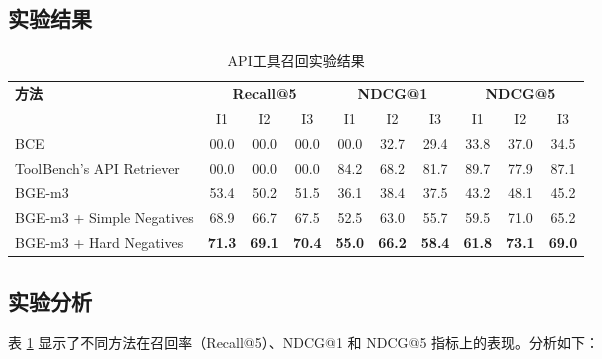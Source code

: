 \subsection{实验结果}

\begin{table}[!ht]
  \centering
  \caption{API工具召回实验结果}
  \label{tab:comparison}
  \begin{tabular}{l|ccc|ccc|ccc}
    \toprule
    \textbf{方法} & \multicolumn{3}{c|}{\textbf{Recall@5}} & \multicolumn{3}{c|}{\textbf{NDCG@1}} & \multicolumn{3}{c}{\textbf{NDCG@5}} \\
    & I1 & I2 & I3 & I1 & I2 & I3 & I1 & I2 & I3 \\
    \midrule

    BCE            & 00.0 & 00.0 & 00.0 & 00.0 & 32.7 & 29.4 & 33.8 & 37.0 & 34.5 \\
    ToolBench's API Retriever & 00.0 & 00.0 & 00.0 & 84.2 & 68.2 & 81.7 & 89.7 & 77.9 & 87.1 \\
    BGE-m3         & 53.4 & 50.2 & 51.5 & 36.1 & 38.4 & 37.5 & 43.2 & 48.1 & 45.2 \\
    BGE-m3 + Simple Negatives   & 68.9 & 66.7 & 67.5 & 52.5 & 63.0 & 55.7 & 59.5 & 71.0 & 65.2 \\
    BGE-m3 + Hard Negatives     & \textbf{71.3} & \textbf{69.1} & \textbf{70.4} & \textbf{55.0} & \textbf{66.2} & \textbf{58.4} & \textbf{61.8} & \textbf{73.1} & \textbf{69.0} \\ 
    \bottomrule
  \end{tabular}
\end{table}

\subsection{实验分析}

表 \ref{tab:comparison} 显示了不同方法在召回率（Recall@5）、NDCG@1 和 NDCG@5 指标上的表现。分析如下：

